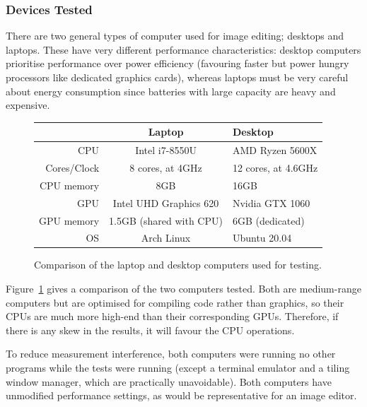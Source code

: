\documentclass[12pt]{article}
\begin{document}
\subsubsection{Devices Tested}

There are two general types of computer used for image editing; desktops and laptops.  These have
very different performance characteristics: desktop computers prioritise performance over power
efficiency (favouring faster but power hungry processors like dedicated graphics cards), whereas
laptops must be very careful about energy consumption since batteries with large capacity are heavy
and expensive.

\begin{figure}
    \begin{center}
        \begin{tabular}{ r | c | l }
                & Laptop & Desktop \\
            \hline
            CPU & Intel i7-8550U      & AMD Ryzen 5600X \\
            Cores/Clock & 8 cores, at 4GHz & 12 cores, at 4.6GHz \\
            CPU memory & 8GB & 16GB \\
            \hline
            GPU & Intel UHD Graphics 620 & Nvidia GTX 1060 \\
            GPU memory & 1.5GB (shared with CPU) & 6GB (dedicated) \\
            \hline
            OS & Arch Linux & Ubuntu 20.04 \\
            \hline
        \end{tabular}
    \end{center}
    \caption{Comparison of the laptop and desktop computers used for
    testing.}\label{fig:test-computers}
\end{figure}

Figure~\ref{fig:test-computers} gives a comparison of the two computers tested.  Both are
medium-range computers but are optimised for compiling code rather than graphics, so their CPUs are
much more high-end than their corresponding GPUs.  Therefore, if there is any skew in the results,
it will favour the CPU operations.

To reduce measurement interference, both computers were running no other programs while the tests
were running (except a terminal emulator and a tiling window manager, which are practically
unavoidable).  Both computers have unmodified performance settings, as would be representative for
an image editor.
\end{document}
